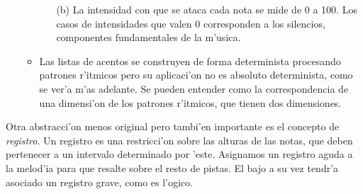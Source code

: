 \begin{enumerate}
\begin{itemize}
\begin{enumerate}
                        \item[(b)] La intensidad con que se ataca cada nota se mide de 0 a 100. Los casos de intensidades que valen 0 corresponden a los silencios, componentes fundamentales de la m'usica.
                        \end{enumerate}
                \item Las listas de acentos se construyen de forma determinista procesando patrones r'itmicos pero su aplicaci'on no es absoluto determinista, como se ver'a m'as adelante. Se pueden entender como la correspondencia de una dimensi'on de los patrones r'itmicos, que tienen dos dimensiones.
                \end{itemize}
        \end{enumerate}

Otra abstracci'on menos original pero tambi'en importante es el concepto de \emph{registro}. Un registro es una restricci'on sobre las alturas de las notas, que deben pertenecer a un intervalo determinado por 'este. Asignamos un registro aguda a la melod'ia para que resalte sobre el resto de pistas. El bajo a su vez tendr'a asociado un registro grave, como es l'ogico.

